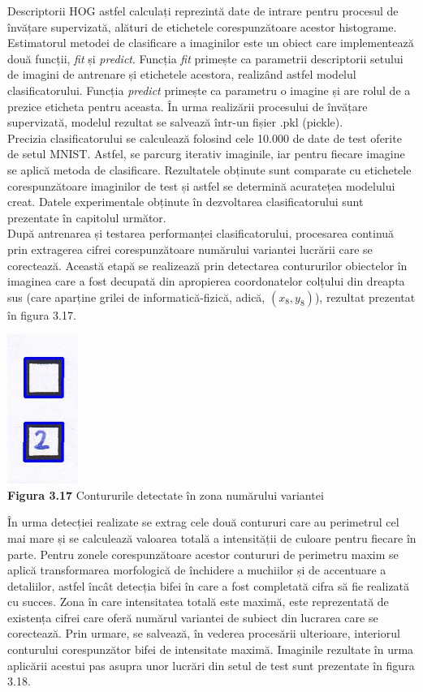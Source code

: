 \documentclass[a4paper,12pt]{report}
\newcommand\tab[1][1cm]{\hspace*{#1}}
\begin{document}
\tab Descriptorii HOG astfel calculați reprezintă date de intrare pentru procesul de învățare supervizată, alături de etichetele corespunzătoare acestor histograme. Estimatorul metodei de clasificare a imaginilor este un obiect care implementează două funcții, \textit{fit} și \textit{predict}. Funcția \textit{fit} primește ca parametrii descriptorii setului de imagini de antrenare și etichetele acestora, realizând astfel modelul clasificatorului. Funcția \textit{predict} primește ca parametru o imagine și are rolul de a prezice eticheta pentru aceasta. În urma realizării procesului de învățare supervizată, modelul rezultat se salvează într-un fișier .pkl (pickle). 
\\ \tab Precizia clasificatorului se calculează folosind cele 10.000 de date de test oferite de setul MNIST. Astfel, se parcurg iterativ imaginile, iar pentru fiecare imagine se aplică metoda de clasificare. Rezultatele obținute sunt comparate cu etichetele corespunzătoare imaginilor de test și astfel se determină acuratețea modelului creat. Datele experimentale obținute în dezvoltarea clasificatorului sunt prezentate în capitolul următor. 
\\ \tab După antrenarea și testarea performanței clasificatorului, procesarea continuă prin extragerea cifrei corespunzătoare numărului variantei lucrării care se corectează. Această etapă se realizează prin detectarea contururilor obiectelor în imaginea care a fost decupată din apropierea coordonatelor colțului din dreapta sus (care aparține grilei de informatică-fizică, adică, $(x_{8}, y_{8})$), rezultat prezentat în figura 3.17. 
\begin {center} 
	\begin {footnotesize} 
		\includegraphics[width = 23mm]{fig3_17} \\
		\textbf  {Figura 3.17}  Contururile detectate în zona numărului variantei
	\end {footnotesize} 
\end {center}
\tab În urma detecției realizate se extrag cele două contururi care au perimetrul cel mai mare și se calculează valoarea totală a intensității de culoare pentru fiecare în parte. Pentru zonele corespunzătoare acestor contururi de perimetru maxim se aplică transformarea morfologică de închidere a muchiilor și de accentuare a detaliilor, astfel încât detecția bifei în care a fost completată cifra să fie realizată cu succes. Zona în care intensitatea totală este maximă, este reprezentată de existența cifrei care oferă numărul variantei de subiect din lucrarea care se corectează. Prin urmare, se salvează, în vederea procesării ulterioare, interiorul conturului corespunzător bifei de intensitate maximă. Imaginile rezultate în urma aplicării acestui pas asupra unor lucrări din setul de test sunt prezentate în figura 3.18.
\end{document}
